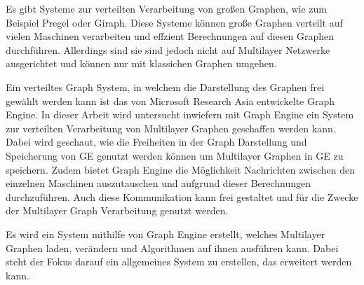 Es gibt Systeme zur verteilten Verarbeitung von großen Graphen, wie zum Beispiel Pregel oder Giraph. Diese Systeme können große Graphen verteilt auf vielen Maschinen verarbeiten und effzient Berechnungen auf diesen Graphen durchführen. Allerdings  sind sie sind jedoch nicht auf Multilayer Netzwerke ausgerichtet und können nur mit klassichen Graphen umgehen.


Ein verteiltes Graph System, in welchem die Darstellung des Graphen frei gewählt werden kann ist das von Microsoft Research Asia entwickelte Graph Engine.
In dieser Arbeit wird untersucht inwiefern mit Graph Engine ein System zur verteilten Verarbeitung von Multilayer Graphen geschaffen werden kann. Dabei wird geschaut, wie die Freiheiten in der Graph Darstellung und Speicherung von GE genutzt werden können
um Multilayer Graphen in GE zu speichern. Zudem bietet Graph Engine die Möglichkeit Nachrichten zwischen den einzelnen Maschinen auszutauschen und aufgrund dieser Berechnungen durchzuführen. Auch diese Kommunikation kann frei gestaltet und für die Zwecke der Multilayer Graph Verarbeitung genutzt werden.

Es wird ein System mithilfe von Graph Engine erstellt, welches Multilayer Graphen laden, verändern und Algorithmen auf ihnen ausführen kann. 
Dabei steht der Fokus darauf ein allgemeines System zu erstellen, das erweitert werden kann. 
